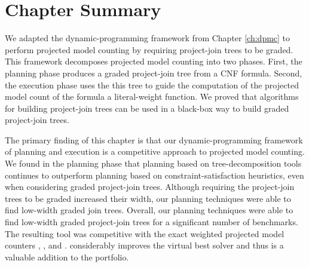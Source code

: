 \section{Chapter Summary}
\label{sec_procount_discussion}

We adapted the dynamic-programming framework from Chapter \ref{ch:dpmc} to perform projected model counting by requiring project-join trees to be graded.
This framework decomposes projected model counting into two phases.
First, the planning phase produces a graded project-join tree from a CNF formula.
Second, the execution phase uses the this tree to guide the computation of the projected model count of the formula \wrt{} a literal-weight function. 
We proved that algorithms for building project-join trees can be used in a black-box way to build graded project-join trees.

{ \color{blue}
The primary finding of this chapter is that our dynamic-programming framework of planning and execution is a competitive approach to projected model counting.
We found in the planning phase that planning based on tree-decomposition tools continues to outperform planning based on constraint-satisfaction heuristics, even when considering graded project-join trees.
Although requiring the project-join trees to be graded increased their width, our planning techniques were able to find low-width graded join trees.
Overall, our planning techniques were able to find low-width graded project-join trees for a significant number of benchmarks.
The resulting tool \procount{} was competitive with the exact weighted projected model counters \dfp{} \cite{lagniez2019recursive}, \projmc{} \cite{lagniez2019recursive}, and \ssat{} \cite{lee2017solving}. 
\procount{} considerably improves the virtual best solver and thus is a valuable addition to the portfolio.
}  %